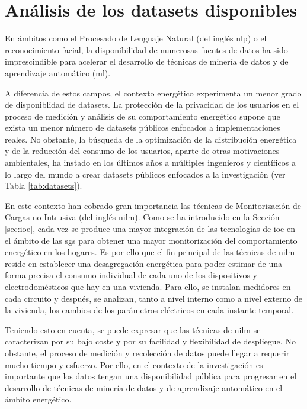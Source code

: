 \section{Análisis de los datasets disponibles}
\label{sec:sustdata}

En ámbitos como el Procesado de Lenguaje Natural (del inglés \gls{nlp}) o el reconocimiento facial, la disponibilidad de numerosas fuentes de datos ha sido imprescindible para acelerar el desarrollo de técnicas de minería de datos y de aprendizaje automático (\gls{ml}).

\vspace{3mm}

A diferencia de estos campos, el contexto energético experimenta un menor grado de disponiblidad de datasets. La protección de la privacidad de los usuarios en el proceso de medición y análisis de su comportamiento energético supone que exista un menor número de datasets públicos enfocados a implementaciones reales. No obstante, la búsqueda de la optimización de la distribución energética y de la reducción del consumo de los usuarios, aparte de otras motivaciones ambientales, ha instado en los últimos años a múltiples ingenieros y científicos a lo largo del mundo a crear datasets públicos enfocados a la investigación (ver Tabla \ref{tab:datasets}). 

\vspace{3mm}

En este contexto han cobrado gran importancia las técnicas de Monitorización de Cargas no Intrusiva (del inglés \gls{nilm}). Como se ha introducido en la Sección \ref{sec:ioe}, cada vez se produce una mayor integración de las tecnologías de \gls{ioe} en el ámbito de las \gls{sg}s para obtener una mayor monitorización del comportamiento energético en los hogares. Es por ello que el fin principal de las técnicas de \gls{nilm} reside en establecer una desagregación energética para poder estimar de una forma precisa el consumo individual de cada uno de los dispositivos y electrodomésticos que hay en una vivienda. Para ello, se instalan medidores en cada circuito y después, se analizan, tanto a nivel interno como a nivel externo de la vivienda, los cambios de los parámetros eléctricos en cada instante temporal.~\cite{nilm} \cite{greend}

\vspace{3mm}

Teniendo esto en cuenta, se puede expresar que las técnicas de \gls{nilm} se caracterizan por su bajo coste y por su facilidad y flexibilidad de despliegue. No obstante, el proceso de medición y recolección de datos puede llegar a requerir mucho tiempo y esfuerzo. Por ello, en el contexto de la investigación es importante que los datos tengan una disponibilidad pública para progresar en el desarrollo de técnicas de minería de datos y de aprendizaje automático en el ámbito energético. 

